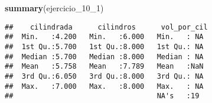 \documentclass[]{article}
\newenvironment{Shaded}{\begin{snugshade}}{\end{snugshade}}
\newcommand{\DecValTok}[1]{\textcolor[rgb]{0.00,0.00,0.81}{#1}}
\newcommand{\KeywordTok}[1]{\textcolor[rgb]{0.13,0.29,0.53}{\textbf{#1}}}
\newcommand{\NormalTok}[1]{#1}
\begin{document}
\begin{Shaded}
\begin{Highlighting}[]
\KeywordTok{summary}\NormalTok{(ejercicio_}\DecValTok{10}\NormalTok{_}\DecValTok{1}\NormalTok{)}
\end{Highlighting}
\end{Shaded}

\begin{verbatim}
##    cilindrada      cilindros      vol_por_cil 
##  Min.   :4.200   Min.   :6.000   Min.   : NA  
##  1st Qu.:5.700   1st Qu.:8.000   1st Qu.: NA  
##  Median :5.700   Median :8.000   Median : NA  
##  Mean   :5.758   Mean   :7.789   Mean   :NaN  
##  3rd Qu.:6.050   3rd Qu.:8.000   3rd Qu.: NA  
##  Max.   :7.000   Max.   :8.000   Max.   : NA  
##                                  NA's   :19
\end{verbatim}
\end{document}
